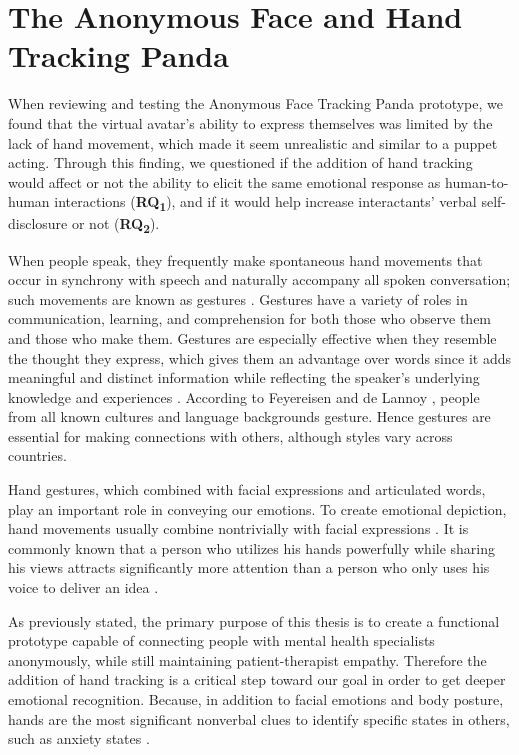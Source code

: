 \section{The Anonymous Face and Hand Tracking Panda}
When reviewing and testing the Anonymous Face Tracking Panda prototype, we found that the virtual avatar's ability to express themselves was limited by the lack of hand movement, which made it seem unrealistic and similar to a puppet acting. Through this finding, we questioned if the addition of hand tracking would affect or not the ability to elicit the same emotional response as human-to-human interactions (\textbf{RQ\textsubscript{1}}), and if it would help increase interactants' verbal self-disclosure or not (\textbf{RQ\textsubscript{2}}).

When people speak, they frequently make spontaneous hand movements that occur in synchrony with speech and naturally accompany all spoken conversation; such movements are known as gestures \cite{CLO20}. Gestures have a variety of roles in communication, learning, and comprehension for both those who observe them and those who make them. Gestures are especially effective when they resemble the thought they express, which gives them an advantage over words since it adds meaningful and distinct information while reflecting the speaker's underlying knowledge and experiences \cite{CLO20, KAN16B}. According to Feyereisen and de Lannoy \cite{FEY91}, people from all known cultures and language backgrounds gesture. Hence gestures are essential for making connections with others, although styles vary across countries.

Hand gestures, which combined with facial expressions and articulated words, play an important role in conveying our emotions. To create emotional depiction, hand movements usually combine nontrivially with facial expressions \cite{ARJ20}. It is commonly known that a person who utilizes his hands powerfully while sharing his views attracts significantly more attention than a person who only uses his voice to deliver an idea \cite{COO10, WAK18}.

As previously stated, the primary purpose of this thesis is to create a functional prototype capable of connecting people with mental health specialists anonymously, while still maintaining patient-therapist empathy. Therefore the addition of hand tracking is a critical step toward our goal in order to get deeper emotional recognition. Because, in addition to facial emotions and body posture, hands are the most significant nonverbal clues to identify specific states in others, such as anxiety states \cite{WAX97, REI22}. 

